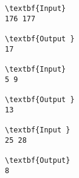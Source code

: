\begin{verbatim}
\textbf{Input} 
176 177
 
\textbf{Output }
17 

\textbf{Input} 
5 9 
 
\textbf{Output } 
13 

\textbf{Input } 
25 28 
 
\textbf{Output}
8 

\end{verbatim}